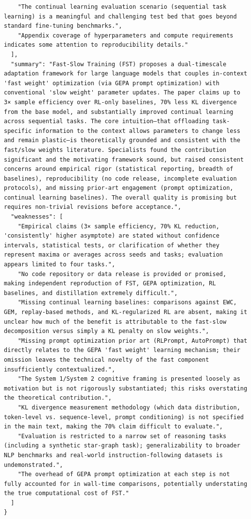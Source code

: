 \documentclass[11pt]{article}
\begin{document}
\begin{verbatim}
    "The continual learning evaluation scenario (sequential task learning) is a meaningful and challenging test bed that goes beyond standard fine-tuning benchmarks.",
    "Appendix coverage of hyperparameters and compute requirements indicates some attention to reproducibility details."
  ],
  "summary": "Fast-Slow Training (FST) proposes a dual-timescale adaptation framework for large language models that couples in-context 'fast weight' optimization (via GEPA prompt optimization) with conventional 'slow weight' parameter updates. The paper claims up to 3× sample efficiency over RL-only baselines, 70% less KL divergence from the base model, and substantially improved continual learning across sequential tasks. The core intuition—that offloading task-specific information to the context allows parameters to change less and remain plastic—is theoretically grounded and consistent with the fast/slow weights literature. Specialists found the contribution significant and the motivating framework sound, but raised consistent concerns around empirical rigor (statistical reporting, breadth of baselines), reproducibility (no code release, incomplete evaluation protocols), and missing prior-art engagement (prompt optimization, continual learning baselines). The overall quality is promising but requires non-trivial revisions before acceptance.",
  "weaknesses": [
    "Empirical claims (3× sample efficiency, 70% KL reduction, 'consistently' higher asymptote) are stated without confidence intervals, statistical tests, or clarification of whether they represent maxima or averages across seeds and tasks; evaluation appears limited to four tasks.",
    "No code repository or data release is provided or promised, making independent reproduction of FST, GEPA optimization, RL baselines, and distillation extremely difficult.",
    "Missing continual learning baselines: comparisons against EWC, GEM, replay-based methods, and KL-regularized RL are absent, making it unclear how much of the benefit is attributable to the fast-slow decomposition versus simply a KL penalty on slow weights.",
    "Missing prompt optimization prior art (RLPrompt, AutoPrompt) that directly relates to the GEPA 'fast weight' learning mechanism; their omission leaves the technical novelty of the fast component insufficiently contextualized.",
    "The System 1/System 2 cognitive framing is presented loosely as motivation but is not rigorously substantiated; this risks overstating the theoretical contribution.",
    "KL divergence measurement methodology (which data distribution, token-level vs. sequence-level, prompt conditioning) is not specified in the main text, making the 70% claim difficult to evaluate.",
    "Evaluation is restricted to a narrow set of reasoning tasks (including a synthetic star-graph task); generalizability to broader NLP benchmarks and real-world instruction-following datasets is undemonstrated.",
    "The overhead of GEPA prompt optimization at each step is not fully accounted for in wall-time comparisons, potentially understating the true computational cost of FST."
  ]
}
\end{verbatim}
\end{document}
